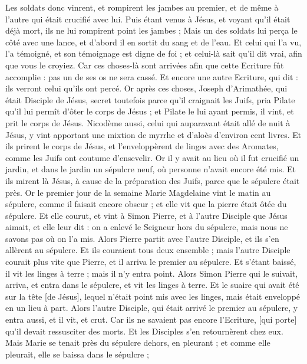 \begin{multicols}{2}
Les soldats donc vinrent, et rompirent les jambes au premier, et de même à l'autre qui était crucifié avec lui.
Puis étant venus à Jésus, et voyant qu'il était déjà mort, ils ne lui rompirent point les jambes ;
Mais un des soldats lui perça le côté avec une lance, et d'abord il en sortit du sang et de l'eau.
Et celui qui l'a vu, l'a témoigné, et son témoignage est digne de foi ; et celui-là sait qu'il dit vrai, afin que vous le croyiez.
Car ces choses-là sont arrivées afin que cette Ecriture fût accomplie : pas un de ses os ne sera cassé.
Et encore une autre Ecriture, qui dit : ils verront celui qu'ils ont percé.
Or après ces choses, Joseph d'Arimathée, qui était Disciple de Jésus, secret toutefois parce qu'il craignait les Juifs, pria Pilate qu'il lui permît d'ôter le corps de Jésus ; et Pilate le lui ayant permis, il vint, et prit le corps de Jésus.
Nicodème aussi, celui qui auparavant était allé de nuit à Jésus, y vint apportant une mixtion de myrrhe et d'aloès d'environ cent livres.
Et ils prirent le corps de Jésus, et l'enveloppèrent de linges avec des Aromates, comme les Juifs ont coutume d'ensevelir.
Or il y avait au lieu où il fut crucifié un jardin, et dans le jardin un sépulcre neuf, où personne n'avait encore été mis.
Et ils mirent là Jésus, à cause de la préparation des Juifs, parce que le sépulcre était près.
\VerseOne{}Or le premier jour de la semaine Marie Magdelaine vint le matin au sépulcre, comme il faisait encore obscur ; et elle vit que la pierre était ôtée du sépulcre.
Et elle courut, et vint à Simon Pierre, et à l'autre Disciple que Jésus aimait, et elle leur dit : on a enlevé le Seigneur hors du sépulcre, mais nous ne savons pas où on l'a mis.
Alors Pierre partit avec l'autre Disciple, et ils s'en allèrent au sépulcre.
Et ils couraient tous deux ensemble ; mais l'autre Disciple courait plus vite que Pierre, et il arriva le premier au sépulcre.
Et s'étant baissé, il vit les linges à terre ; mais il n'y entra point.
Alors Simon Pierre qui le suivait, arriva, et entra dans le sépulcre, et vit les linges à terre.
Et le suaire qui avait été sur la tête [de Jésus], lequel n'était point mis avec les linges, mais était enveloppé en un lieu à part.
Alors l'autre Disciple, qui était arrivé le premier au sépulcre, y entra aussi, et il vit, et crut.
Car ils ne savaient pas encore l'Ecriture, [qui porte] qu'il devait ressusciter des morts.
Et les Disciples s'en retournèrent chez eux.
Mais Marie se tenait près du sépulcre dehors, en pleurant ; et comme elle pleurait, elle se baissa dans le sépulcre ;

\end{multicols}
